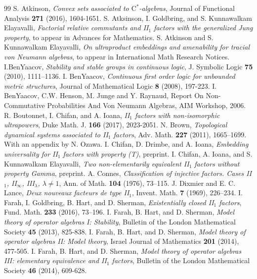 \documentclass[12pt]{amsart}
\theoremstyle{definition}
\newcommand{\cstar}{$\mathrm{C}^*$}
\begin{document}
\begin{thebibliography}{99}
 S. Atkinson, \emph{Convex sets associated to \cstar-algebras}, Journal of Functional Analysis \textbf{271} (2016), 1604-1651.
 S. Atksinson, I. Goldbring, and S. Kunnawalkam Elayavalli, \emph{Factorial relative commutants and II$_1$ factors with the generalized Jung property}, to appear in Advances for Mathematics.
 S. Atkinson and S. Kunnawalkam Elayavalli, \emph{On ultraproduct embeddings and amenability for tracial von Neumann algebras}, to appear in International Math Research Notices.
 I.BenYaacov, \emph{Stability and stable groups in continuous logic}, J. Symbolic Logic \textbf{75} (2010), 1111–1136.
 I. BenYaacov, \emph{Continuous first order logic for unbounded metric structures}, Journal of Mathematical Logic \textbf{8} (2008), 197-223.
 I. BenYaacov, C.W. Henson, M. Junge and Y. Raynaud, Report On Non-Commutative Probabilities And Von Neumann Algebras, AIM Workshop, 2006. %
 R. Boutonnet, I. Chifan, and A. Ioana, \emph{II$_1$ factors with non-isomorphic ultrapowers}, Duke Math. J. \textbf{166} (2017), 2023-2051.
 N. Brown, \emph{Topological dynamical systems associated to II$_1$ factors}, Adv. Math. \textbf{227} (2011), 1665–1699. With an appendix by N. Ozawa.
 I. Chifan, D. Drimbe, and A. Ioana, \emph{Embedding universality for II$_1$ factors with property (T)}, preprint.
 I. Chifan, A. Ioana, and S. Kunnawalkam Elayavalli, \emph{Two non-elementarily equivalent II$_1$ factors without property Gamma}, preprint.
 A. Connes, \emph{Classification of injective factors. Cases II$_1$, II$_\infty$, III$_\lambda$, $\lambda\not=1$}, Ann. of Math. \textbf{104} (1976), 73–115.
 J. Dixmier and E. C. Lance, \emph{Deux nouveaux facteurs de type II$_1$}, Invent. Math. \textbf{7} (1969), 226–234.
 I. Farah, I. Goldbring, B. Hart, and D. Sherman, \emph{Existentially closed II$_1$ factors}, Fund. Math. \textbf{233} (2016), 73–196.
I. Farah, B. Hart, and D. Sherman, \emph{Model theory of operator algebras I:  Stability}, Bulletin of the London Mathematical Society \textbf{45} (2013), 825-838.
I. Farah, B. Hart, and D. Sherman, \emph{Model theory of operator algebras II:  Model theory}, Israel Journal of Mathematics \textbf{201} (2014), 477-505.
I. Farah, B. Hart, and D. Sherman, \emph{Model theory of operator algebras III:  elementary equivalence and II$_1$ factors}, Bulletin of the London Mathematical Society \textbf{46} (2014), 609-628.

\end{thebibliography}
\end{document}
